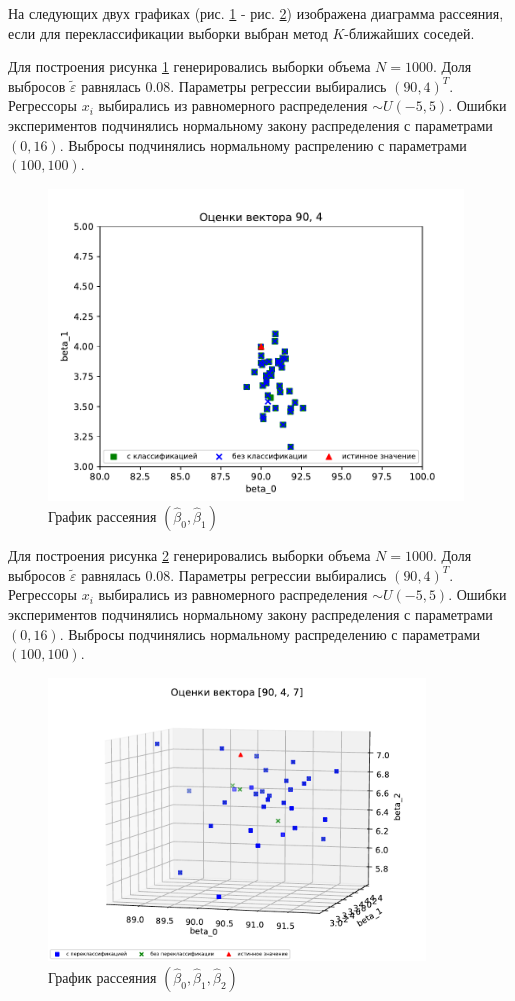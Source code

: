 На следующих двух графиках (рис. \ref{pic4} - рис. \ref{pic5}) изображена диаграмма рассеяния, если для переклассификации выборки выбран метод $K$-ближайших соседей.

Для построения рисунка \ref{pic4} генерировались выборки объема $N = 1000$. Доля выбросов $\widetilde{\varepsilon}$ равнялась $0.08$. 
Параметры регрессии выбирались $(90, 4)^T$. 
Регрессоры $x_i$ выбирались из равномерного распределения $\sim U(-5,5)$. 
Ошибки экспериментов подчинялись нормальному закону распределения с параметрами $(0, 16)$. Выбросы подчинялись нормальному распрелению с параметрами $(100, 100)$. 

\begin{figure}[h]
    \centering
    \includegraphics[width=110mm]{../images/plot_90_4_with-without_(3).pdf}
    \caption{График рассеяния $(\hat{\beta}_0,\hat{\beta}_1)$\label{overflow}}
    \label{pic4}
\end{figure}

Для построения рисунка \ref{pic5} генерировались выборки объема $N = 1000$. Доля выбросов $\widetilde{\varepsilon}$ равнялась $0.08$. 
Параметры регрессии выбирались $(90, 4)^T$. 
Регрессоры $x_i$ выбирались из равномерного распределения $\sim U(-5,5)$. 
Ошибки экспериментов подчинялись нормальному закону распределения с параметрами $(0, 16)$. Выбросы подчинялись нормальному распределению с параметрами $(100, 100)$. 
\newpage

\begin{figure}[h]
    \centering
    \includegraphics[width=100mm]{../images/plot_90_4_7_(4).pdf}
    \caption{График рассеяния $(\hat{\beta}_0,\hat{\beta}_1, \hat{\beta}_2)$\label{overflow}}
    \label{pic5}
\end{figure}

